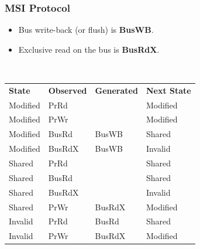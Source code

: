 \begin{frame}
  \frametitle{MSI Protocol}

  
  \begin{itemize}
    \item Bus write-back (or flush) is {\bf BusWB}.
    \item Exclusive read on the bus is {\bf BusRdX}.
  \end{itemize}~\\

  \begin{center}
    \begin{tabular}{llll}
      {\bf State} & {\bf Observed} & {\bf Generated} & {\bf Next State}\\
      Modified   & PrRd   &        & Modified\\
      Modified   & PrWr   &        & Modified\\
      Modified   & BusRd  & BusWB  & Shared\\
      Modified   & BusRdX & BusWB  & Invalid\\
      Shared     & PrRd   &        & Shared\\
      Shared     & BusRd  &        & Shared\\
      Shared     & BusRdX &        & Invalid\\
      Shared     & PrWr   & BusRdX & Modified\\
      Invalid    & PrRd   & BusRd  & Shared\\
      Invalid    & PrWr   & BusRdX & Modified\\
    \end{tabular}
  \end{center}
  
\end{frame}

